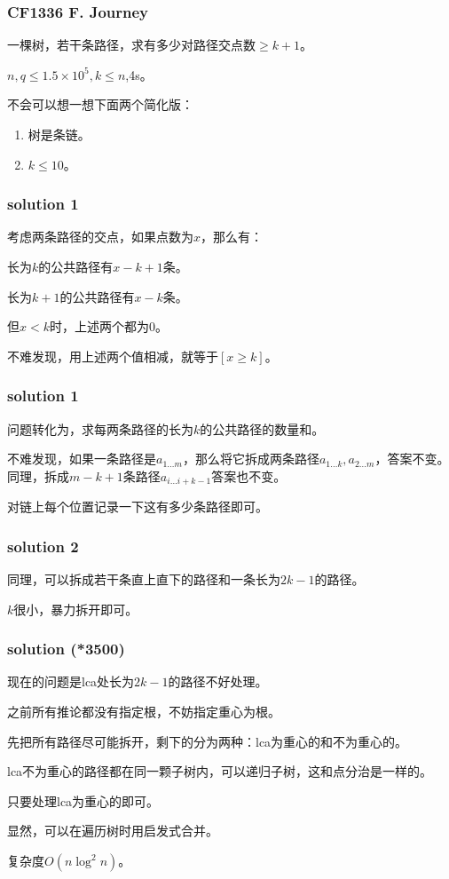 \documentclass[10pt]{beamer}
\begin{document}
	\clearpage
	\begin{frame}
		\frametitle{CF1336 F. Journey}

		一棵树，若干条路径，求有多少对路径交点数$\ge k+1$。

		$n,q\le 1.5\times 10^5,k\le n$,4s。

		不会可以想一想下面两个简化版：

		\begin{enumerate}
			\item 树是条链。
			\item $k\le 10$。
		\end{enumerate}

	\end{frame}
	\clearpage
	\begin{frame}
		\frametitle{solution 1}
	
		考虑两条路径的交点，如果点数为$x$，那么有：

		长为$k$的公共路径有$x-k+1$条。

		长为$k+1$的公共路径有$x-k$条。

		但$x<k$时，上述两个都为$0$。

		不难发现，用上述两个值相减，就等于$[x\ge k]$。
	
	\end{frame}
	\clearpage
	\begin{frame}
		\frametitle{solution 1}
	
		问题转化为，求每两条路径的长为$k$的公共路径的数量和。
	
		不难发现，如果一条路径是$a_{1\dots m}$，那么将它拆成两条路径$a_{1\dots k},a_{2\dots m}$，答案不变。同理，拆成$m-k+1$条路径$a_{i\dots i+k-1}$答案也不变。

		对链上每个位置记录一下这有多少条路径即可。

	\end{frame}
	\clearpage
	\begin{frame}
		\frametitle{solution 2}
	
		同理，可以拆成若干条直上直下的路径和一条长为$2k-1$的路径。

		$k$很小，暴力拆开即可。
	
	\end{frame}
	\clearpage
	\begin{frame}
		\frametitle{solution (*3500)}
	
		现在的问题是lca处长为$2k-1$的路径不好处理。

		之前所有推论都没有指定根，不妨指定重心为根。

		先把所有路径尽可能拆开，剩下的分为两种：lca为重心的和不为重心的。

		lca不为重心的路径都在同一颗子树内，可以递归子树，这和点分治是一样的。

		只要处理lca为重心的即可。

		显然，可以在遍历树时用启发式合并。

		复杂度$O(n\log^2 n)$。
	
	\end{frame}
\end{document}
